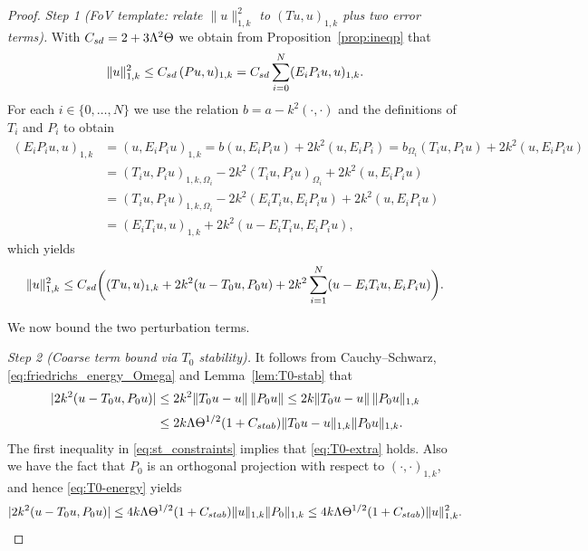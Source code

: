\documentclass[preprint,3p,times]{elsarticle}
\newcommand{\Cstab}{C_{\textup{\textsf{stab}}}}
\newcommand{\Csd}{C_{\textup{\textsf{sd}}}}
\theoremstyle{definition}
\numberwithin{equation}{section}
\begin{document}
\begin{proof}
\textit{Step 1 (FoV template: relate $\|u\|_{1, k}^2$ to $(Tu,u)_{1, k}$ plus two error terms).}
With $\Csd = 2+3\Lambda^2\Theta$ we obtain from Proposition~\ref{prop:ineqp} that
\[
	\|u\|_{1, k}^2 \le \Csd\,(Pu,u)_{1, k} = \Csd\sum_{i=0}^N (E_iP_iu,u)_{1, k}.
\]
For each $i\in\{0,\ldots,N\}$ we use the relation $b=a-k^2(\cdot,\cdot)$ and the definitions of $T_i$ and $P_i$ to obtain
\begin{align*}
	(E_iP_iu,u)_{1, k} &= (u,E_iP_iu)_{1, k}
	= b(u,E_iP_iu) + 2 k^2(u,E_iP_i)
	= b_{\Omega_i}(T_iu,P_iu) + 2 k^2(u,E_iP_iu)
	\\[0.5ex]
	&= (T_iu,P_iu)_{1, k, \Omega_i} - 2 k^2(T_iu,P_iu)_{\Omega_i} + 2 k^2(u,E_iP_iu)
	\\[0.5ex]
    &= (T_iu,P_iu)_{1, k, \Omega_i} - 2 k^2(E_i T_iu, E_i P_iu) + 2 k^2(u,E_iP_iu)
	\\[0.5ex]
	&= (E_iT_iu,u)_{1, k} + 2 k^2(u-E_i T_iu,E_i P_iu),
\end{align*}
which yields
\begin{equation}\label{eq:prelim}
	\|u\|_{1, k}^2 \le \Csd\biggl((Tu,u)_{1, k} + 2 k^2(u-T_0u,P_0u) + 2 k^2\sum_{i=1}^N (u-E_i T_iu,E_i P_iu)\biggr).
\end{equation}

We now bound the two perturbation terms.

\medskip

\noindent\textit{Step 2 (Coarse term bound via $T_0$ stability).}
It follows from Cauchy--Schwarz, \eqref{eq:friedrichs_energy_Omega} and Lemma~\ref{lem:T0-stab} that
\begin{align*}
	|2 k^2(u-T_0u,P_0u)| &\le 2 k^2\|T_0u-u\|\,\|P_0u\|
	\le 2 k\|T_0u-u\|\,\|P_0u\|_{1, k}
	\\[0.5ex]
	&\le 2k\Lambda\Theta^{1/2}(1+\Cstab)\|T_0u-u\|_{1, k}\|P_0u\|_{1, k}.
\end{align*}
The first inequality in \eqref{eq:st_constraints} implies that \eqref{eq:T0-extra} holds. Also we have the fact that $P_0$ is an orthogonal projection with respect to $(\cdot, \cdot)_{1, k}$,
and hence \eqref{eq:T0-energy} yields
\begin{equation}\label{eq:coarse-term}
	|2 k^2(u-T_0u,P_0u)| \le 4k\Lambda\Theta^{1/2}(1+\Cstab)\|u\|_{1, k}\|P_0\|_{1, k} \le 4k\Lambda\Theta^{1/2}(1+\Cstab)\|u\|_{1, k}^2.
\end{equation}




\end{proof}
\end{document}
